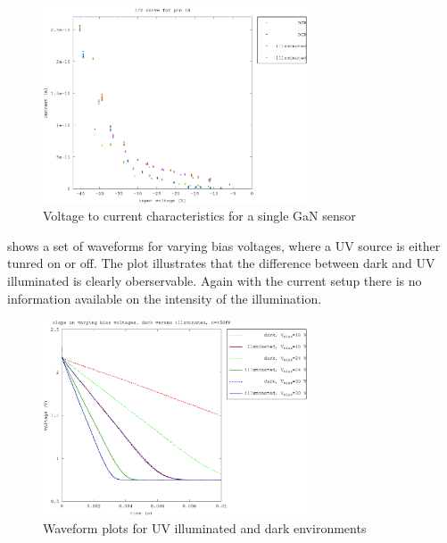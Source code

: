 \begin{figure}[h]
	    \centering
        \includegraphics[width=0.7\textwidth]{fig/pin18_slope_lin_UV.eps}
	    \caption[]%
	    {Voltage to current characteristics for a single GaN sensor}    
	    \label{fig:pin18_slope_lin}	
\end{figure}  


 shows a set of waveforms for varying bias voltages, where a UV source is either tunred on or off. The plot illustrates that the difference between dark and UV illuminated is clearly oberservable. Again with the current setup there is no information available on the intensity of the illumination.

\begin{figure}[h]
	    \centering
        \includegraphics[width=0.7\textwidth]{fig/slope_illuminated.eps}
	    \caption[]%
	    {Waveform plots for UV illuminated and dark environments}    
	    \label{fig:slope_illuminated}	
\end{figure} 



\clearpage
